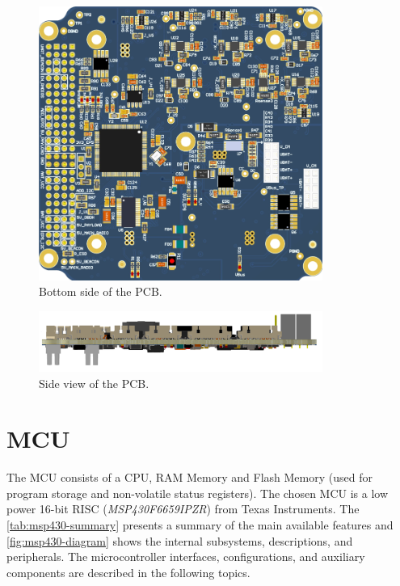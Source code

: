 \begin{figure}[!ht]
    \begin{center}
        \includegraphics[width=93mm]{figures/eps2-pcb-bottom.png}
        \caption{Bottom side of the PCB.}
        \label{fig:pcb-bottom}
    \end{center}
\end{figure}

\begin{figure}[!ht]
    \begin{center}
        \includegraphics[width=93mm]{figures/eps2-pcb-side.png}
        \caption{Side view of the PCB.}
        \label{fig:pcb-side}
    \end{center}
\end{figure}

\section{MCU}

The MCU consists of a CPU, RAM Memory and Flash Memory (used for program storage and non-volatile status registers). The chosen MCU is a low power 16-bit RISC (\textit{MSP430F6659IPZR}) from Texas Instruments\cite{msp430f6659}. The \autoref{tab:msp430-summary} presents a summary of the main available features and \autoref{fig:msp430-diagram} shows the internal subsystems, descriptions, and peripherals. The microcontroller interfaces, configurations, and auxiliary components are described in the following topics.

